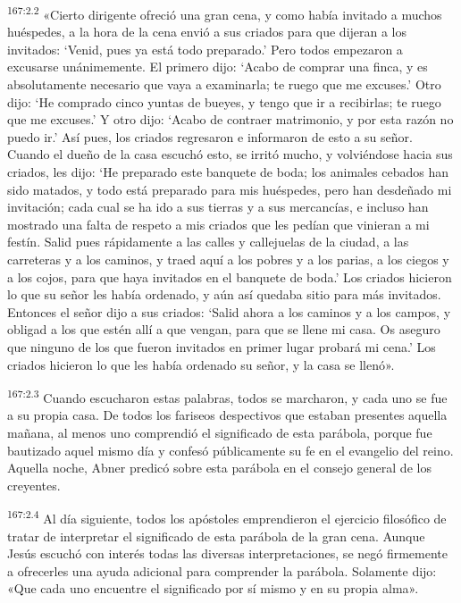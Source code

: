 \par 
\textsuperscript{167:2.2} «Cierto dirigente ofreció una gran cena, y como había invitado a muchos huéspedes, a la hora de la cena envió a sus criados para que dijeran a los invitados:
`Venid, pues ya está todo preparado.' Pero todos empezaron a excusarse unánimemente. El primero dijo: `Acabo de comprar una finca, y es absolutamente necesario que vaya a examinarla; te ruego que me excuses.' Otro dijo: `He comprado cinco yuntas de bueyes, y tengo que ir a recibirlas; te ruego que me excuses.' Y otro dijo: `Acabo de contraer matrimonio, y por esta razón no puedo ir.' Así pues, los criados regresaron e informaron de esto a su señor. Cuando el dueño de la casa escuchó esto, se irritó mucho, y volviéndose hacia sus criados, les dijo: `He preparado este banquete de boda; los animales cebados han sido matados, y todo está preparado para mis huéspedes, pero han desdeñado mi invitación; cada cual se ha ido a sus tierras y a sus mercancías, e incluso han mostrado una falta de respeto a mis criados que les pedían que vinieran a mi festín. Salid pues rápidamente a las calles y callejuelas de la ciudad, a las carreteras y a los caminos, y traed aquí a los pobres y a los parias, a los ciegos y a los cojos, para que haya invitados en el banquete de boda.' Los criados hicieron lo que su señor les había ordenado, y aún así quedaba sitio para más invitados. Entonces el señor dijo a sus criados: `Salid ahora a los caminos y a los campos, y obligad a los que estén allí a que vengan, para que se llene mi casa. Os aseguro que ninguno de los que fueron invitados en primer lugar probará mi cena.' Los criados hicieron lo que les había ordenado su señor, y la casa se llenó».

\par 
\textsuperscript{167:2.3} Cuando escucharon estas palabras, todos se marcharon, y cada uno se fue a su propia casa. De todos los fariseos despectivos que estaban presentes aquella mañana, al menos uno comprendió el significado de esta parábola, porque fue bautizado aquel mismo día y confesó públicamente su fe en el evangelio del reino. Aquella noche, Abner predicó sobre esta parábola en el consejo general de los creyentes.

\par 
\textsuperscript{167:2.4} Al día siguiente, todos los apóstoles emprendieron el ejercicio filosófico de tratar de interpretar el significado de esta parábola de la gran cena. Aunque Jesús escuchó con interés todas las diversas interpretaciones, se negó firmemente a ofrecerles una ayuda adicional para comprender la parábola. Solamente dijo: «Que cada uno encuentre el significado por sí mismo y en su propia alma».

